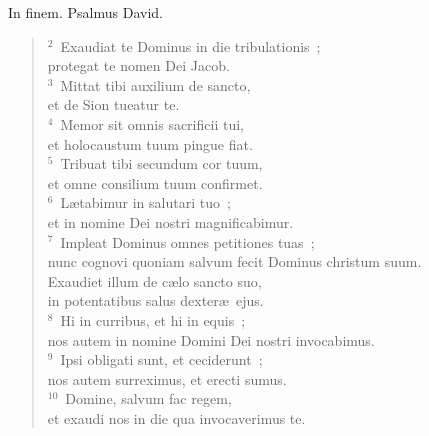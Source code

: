 \bchapter
\lettrine[lines=3,image=true,loversize=0.05,lraise=-0.03]{I}{}n finem. Psalmus David.
\begin{flushleft}\begin{verse}\vspace{6pt}${}^{2}$~Exaudiat te Dominus in die tribulationis~;\\ protegat te nomen Dei Jacob.\\
${}^{3}$~Mittat tibi auxilium de sancto,\\ et de Sion tueatur te.\\
${}^{4}$~Memor sit omnis sacrificii tui,\\ et holocaustum tuum pingue fiat.\\
${}^{5}$~Tribuat tibi secundum cor tuum,\\ et omne consilium tuum confirmet.\\
${}^{6}$~L\ae tabimur in salutari tuo~;\\ et in nomine Dei nostri magnificabimur.\\
${}^{7}$~Impleat Dominus omnes petitiones tuas~;\\ nunc cognovi quoniam salvum fecit Dominus christum suum.\\ Exaudiet illum de c\ae lo sancto suo,\\ in potentatibus salus dexter\ae\ ejus.\\
${}^{8}$~Hi in curribus, et hi in equis~;\\ nos autem in nomine Domini Dei nostri invocabimus.\\
${}^{9}$~Ipsi obligati sunt, et ceciderunt~;\\ nos autem surreximus, et erecti sumus.\\
${}^{10}$~Domine, salvum fac regem,\\ et exaudi nos in die qua invocaverimus te.\end{verse}\end{flushleft}



